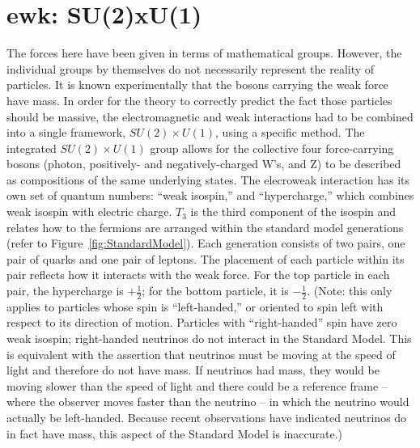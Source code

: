 \section{ewk: SU(2)xU(1)}
The forces here have been given in terms 
of mathematical groups.  
However, the individual groups by themselves 
do not necessarily represent the reality of particles.  
It is known experimentally that the bosons carrying 
the weak force have mass.  
In order for the theory to correctly predict the 
fact those particles should be massive, 
the electromagnetic and weak interactions had to be combined 
into a single framework, 
$SU(2) \times U(1)$, using a specific method.  
The integrated $SU(2) \times U(1)$ group 
allows for the collective four force-carrying bosons 
(photon, positively- and negatively-charged W's, and Z) 
to be described as compositions of the same underlying states.  
The elecroweak interaction has its own set of quantum 
numbers: ``weak isospin,'' and ``hypercharge,'' 
which combines weak isospin with electric charge.  
$T_3$ is the third component of the isospin 
and relates how to the fermions are arranged 
within the standard model generations 
(refer to Figure~\ref{fig:StandardModel}).  
Each generation consists of two pairs, 
one pair of quarks and one pair of leptons.  
The placement of each particle within its pair 
reflects how it interacts with the weak force.  
For the top particle in each pair, the hypercharge 
is $+\frac{1}{2}$; 
for the bottom particle, it is $-\frac{1}{2}$.  
(Note: this only applies to particles whose spin 
is ``left-handed,'' 
or oriented to spin left with respect to its direction of motion.  
Particles with ``right-handed'' spin have zero weak isospin; 
right-handed neutrinos do not interact in the Standard Model.  
This is equivalent with the assertion that neutrinos 
must be moving at the speed of light and therefore 
do not have mass. 
If neutrinos had mass, 
they would be moving slower than the speed of light 
and there could be a reference frame -- 
where the observer moves faster than the neutrino -- 
in which the neutrino would actually be left-handed.  
Because recent observations have indicated neutrinos %
do in fact have mass, 
this aspect of the Standard Model is inaccurate.)  

